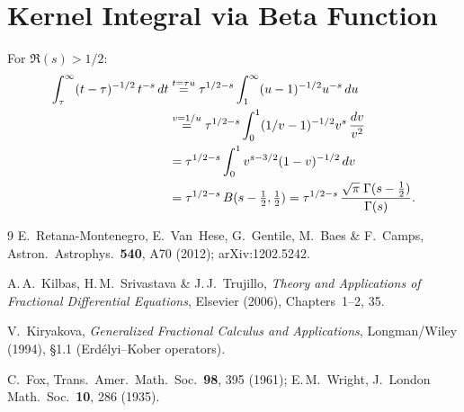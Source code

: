 \documentclass{article}
\begin{document}
\appendix
\section{Kernel Integral via Beta Function}
\label{app:kernel}

For $\Re(s)>1/2$:
\begin{align}
\int_\tau^\infty(t-\tau)^{-1/2}\,t^{-s}\,dt
&\overset{t=\tau u}{=}
\tau^{1/2-s}\int_1^\infty (u-1)^{-1/2}u^{-s}\,du \notag\\
&\overset{v=1/u}{=}
\tau^{1/2-s}\int_0^1 (1/v-1)^{-1/2}v^s\,\frac{dv}{v^2} \notag\\
&= \tau^{1/2-s}\int_0^1 v^{s-3/2}(1-v)^{-1/2}\,dv \notag\\
&= \tau^{1/2-s}\,B(s-{\textstyle\frac12},{\textstyle\frac12})
= \tau^{1/2-s}\,\frac{\sqrt\pi\;\Gamma(s-\frac12)}{\Gamma(s)}.
\end{align}

\begin{thebibliography}{9}
E.~Retana-Montenegro, E.~Van~Hese, G.~Gentile, M.~Baes \& F.~Camps,
Astron.\ Astrophys.\ \textbf{540}, A70 (2012); arXiv:1202.5242.

A.\,A.~Kilbas, H.\,M.~Srivastava \& J.\,J.~Trujillo,
\textit{Theory and Applications of Fractional Differential Equations},
Elsevier (2006), Chapters~1--2, 35.

V.~Kiryakova,
\textit{Generalized Fractional Calculus and Applications},
Longman/Wiley (1994), \S1.1 (Erd\'elyi--Kober operators).

C.~Fox, Trans.\ Amer.\ Math.\ Soc.\ \textbf{98}, 395 (1961);
E.\,M.~Wright, J.~London Math.\ Soc.\ \textbf{10}, 286 (1935).
\end{thebibliography}
\end{document}
